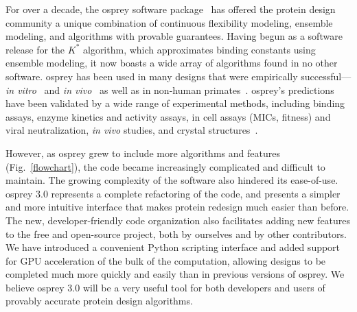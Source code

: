 For over a decade, the {\sc osprey} software package~\cite{OSPREY,minDEE,OSPREY_MIE} has offered the protein design community a unique combination of continuous flexibility modeling, ensemble modeling, and algorithms with provable guarantees.  Having begun as a software release for the $K^*$ algorithm, which approximates binding constants using ensemble modeling, it now boasts a wide array of algorithms found in no other software.  {\sc osprey} has been used in many designs that were empirically successful---\textit{in vitro}~\cite{VRC07_enhance,CFTR,runx1_cbfb,GrsA-LeuA,DHFR-PNAS,GrsA-TyrA,specific_probes} and \textit{in vivo}~\cite{VRC07_enhance,CFTR,runx1_cbfb,DHFR-PNAS} as well as in non-human primates~\cite{VRC07_enhance}.  {\sc osprey}'s predictions have been validated by a wide range of experimental methods, including binding assays, enzyme kinetics and activity assays, in cell assays (MICs, fitness) and viral neutralization, {\em in vivo} studies, and crystal structures~\cite{DHFR-PNAS2, VRC07_enhance}.    

However, as {\sc osprey} grew to include more algorithms and features (Fig.~\ref{flowchart}), the code became increasingly complicated and difficult to maintain.  The growing complexity of the software also hindered its ease-of-use. {\sc osprey} 3.0 represents a complete refactoring of the code, and presents a simpler and more intuitive interface that makes protein redesign much easier than before. The new, developer-friendly code organization also facilitates adding new features to the free and open-source \osprey project, both by ourselves and by other contributors.  We have introduced a convenient Python scripting interface and added support for GPU acceleration of the bulk of the computation, allowing designs to be completed much more quickly and easily than in previous versions of {\sc osprey}.  We believe {\sc osprey} 3.0 will be a very useful tool for both developers and users of provably accurate protein design algorithms.  


